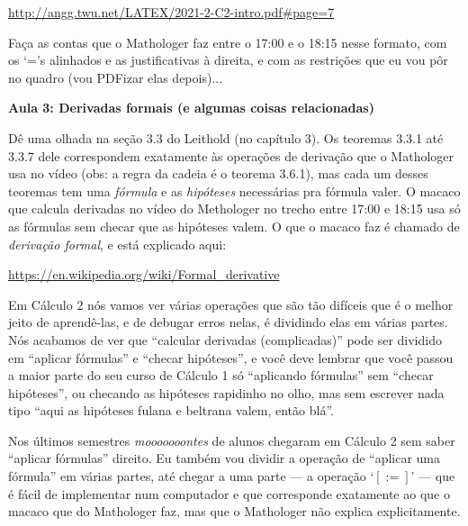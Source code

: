 \documentclass[oneside,12pt]{article}
\begin{document}
\ssk

{\footnotesize

\url{http://angg.twu.net/LATEX/2021-2-C2-intro.pdf#page=7}

}

\ssk

Faça as contas que o Mathologer faz entre o 17:00 e o 18:15 nesse
formato, com os `='s alinhados e as justificativas à direita, e com as
restrições que eu vou pôr no quadro (vou PDFizar elas depois)...


\newpage


{\bf Aula 3: Derivadas formais (e algumas coisas relacionadas)}

\ssk


Dê uma olhada na seção 3.3 do Leithold (no capítulo 3). Os teoremas
3.3.1 até 3.3.7 dele correspondem exatamente às operações de derivação
que o Mathologer usa no vídeo (obs: a regra da cadeia é o teorema
3.6.1), mas cada um desses teoremas tem uma {\sl fórmula} e as {\sl
  hipóteses} necessárias pra fórmula valer. O macaco que calcula
derivadas no vídeo do Methologer no trecho entre 17:00 e 18:15 usa só
as fórmulas sem checar que as hipóteses valem. O que o macaco faz é
chamado de {\sl derivação formal}, e está explicado aqui:

\ssk

\url{https://en.wikipedia.org/wiki/Formal_derivative}

\msk

Em Cálculo 2 nós vamos ver várias operações que são tão difíceis que é
o melhor jeito de aprendê-las, e de debugar erros nelas, é dividindo
elas em várias partes. Nós acabamos de ver que ``calcular derivadas
(complicadas)'' pode ser dividido em ``aplicar fórmulas'' e ``checar
hipóteses'', e você deve lembrar que você passou a maior parte do seu
curso de Cálculo 1 só ``aplicando fórmulas'' sem ``checar hipóteses'',
ou checando as hipóteses rapidinho no olho, mas sem escrever nada tipo
``aqui as hipóteses fulana e beltrana valem, então blá''.

Nos últimos semestres {\sl mooooooontes} de alunos chegaram em Cálculo
2 sem saber ``aplicar fórmulas'' direito. Eu também vou dividir a
operação de ``aplicar uma fórmula'' em várias partes, até chegar a uma
parte --- a operação `$[:=]$' --- que é fácil de implementar num
computador e que corresponde exatamente ao que o macaco que do
Mathologer faz, mas que o Mathologer não explica explicitamente.
\end{document}
